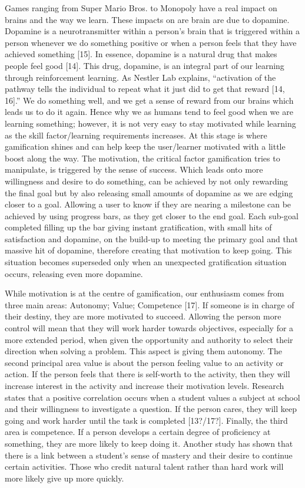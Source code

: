		Games ranging from Super Mario Bros. to Monopoly have a real impact on brains and the way we learn. These impacts on are brain are due to dopamine. Dopamine is a neurotransmitter within a person’s brain that is triggered within a person whenever we do something positive or when a person feels that they have achieved something [15]. In essence, dopamine is a natural drug that makes people feel good [14]. This drug, dopamine, is an integral part of our learning through reinforcement learning. As Nestler Lab explains, “activation of the pathway tells the individual to repeat what it just did to get that reward [14, 16].” We do something well, and we get a sense of reward from our brains which leads us to do it again. Hence why we as humans tend to feel good when we are learning something; however, it is not very easy to stay motivated while learning as the skill factor/learning requirements increases. At this stage is where gamification shines and can help keep the user/learner motivated with a little boost along the way. The motivation, the critical factor gamification tries to manipulate, is triggered by the sense of success. Which leads onto more willingness and desire to do something, can be achieved by not only rewarding the final goal but by also releasing small amounts of dopamine as we are edging closer to a goal. Allowing a user to know if they are nearing a milestone can be achieved by using progress bars, as they get closer to the end goal. Each sub-goal completed filling up the bar giving instant gratification, with small hits of satisfaction and dopamine, on the build-up to meeting the primary goal and that massive hit of dopamine, therefore creating that motivation to keep going. This situation becomes superseded only when an unexpected gratification situation occurs, releasing even more dopamine.
		
		While motivation is at the centre of gamification, our enthusiasm comes from three main areas: Autonomy; Value; Competence [17]. If someone is in charge of their destiny, they are more motivated to succeed. Allowing the person more control will mean that they will work harder towards objectives, especially for a more extended period, when given the opportunity and authority to select their direction when solving a problem. This aspect is giving them autonomy. The second principal area value is about the person feeling value to an activity or action. If the person feels that there is self-worth to the activity, then they will increase interest in the activity and increase their motivation levels. Research states that a positive correlation occurs when a student values a subject at school and their willingness to investigate a question. If the person cares, they will keep going and work harder until the task is completed [13?/17?]. Finally, the third area is competence. If a person develops a certain degree of proficiency at something, they are more likely to keep doing it. Another study has shown that there is a link between a student’s sense of mastery and their desire to continue certain activities. Those who credit natural talent rather than hard work will more likely give up more quickly.
		
